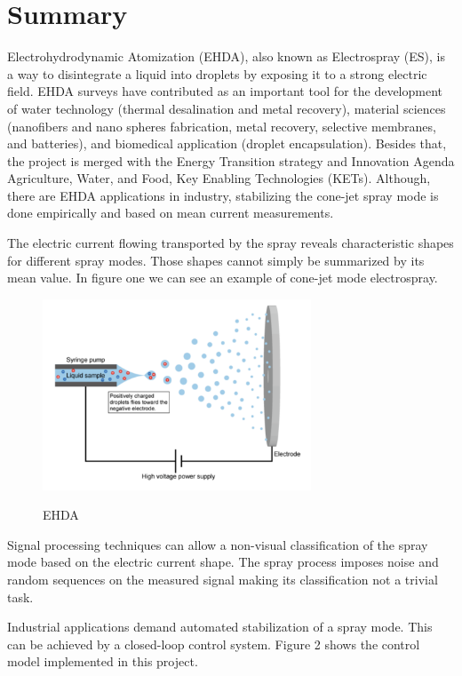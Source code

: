 \section{Summary}

        Electrohydrodynamic Atomization (EHDA), also known as Electrospray (ES), is a way to disintegrate a liquid into droplets by exposing it to a strong electric field.
EHDA surveys have contributed as an important tool for the development of water technology (thermal desalination and metal recovery), material sciences (nanofibers and nano spheres fabrication, metal recovery, selective membranes, and batteries), and biomedical application (droplet encapsulation).
Besides that, the project is merged with the Energy Transition strategy and Innovation Agenda Agriculture, Water, and Food, Key Enabling Technologies (KETs). 
Although, there are EHDA applications in industry, stabilizing the cone-jet spray mode is done empirically and based on mean current measurements. 

The electric current flowing transported by the spray reveals characteristic shapes for different spray modes.
Those shapes cannot simply be summarized by its mean value. In figure one we can see an example of cone-jet mode electrospray.

\begin{figure}[H]
    \center
    \includegraphics[width=8cm]{images/electrospray.png}
    \label{img1}
    \caption{EHDA}
\end{figure}

Signal processing techniques can allow a non-visual classification of the spray mode based on the electric current shape.
The spray process imposes noise and random sequences on the measured signal making its classification not a trivial task. 

Industrial applications demand automated stabilization of a spray mode.
This can be achieved by a closed-loop control system. Figure 2 shows the control model implemented in this project.

